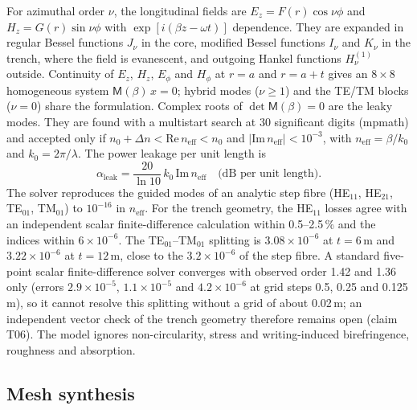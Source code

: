 \documentclass[11pt,a4paper]{article}
\newcommand{\um}{\,\textmu m\xspace}
\begin{document}
For azimuthal order $\nu$, the longitudinal fields are $E_z=F(r)\cos\nu\phi$ and $H_z=G(r)\sin\nu\phi$ with $\exp[i(\beta z-\omega t)]$ dependence. They are expanded in regular Bessel functions $J_\nu$ in the core, modified Bessel functions $I_\nu$ and $K_\nu$ in the trench, where the field is evanescent, and outgoing Hankel functions $H^{(1)}_\nu$ outside. Continuity of $E_z$, $H_z$, $E_\phi$ and $H_\phi$ at $r=a$ and $r=a+t$ gives an $8\times8$ homogeneous system $\mathsf{M}(\beta)\,x=0$; hybrid modes ($\nu\ge1$) and the TE/TM blocks ($\nu=0$) share the formulation. Complex roots of $\det\mathsf{M}(\beta)=0$ are the leaky modes. They are found with a multistart search at 30 significant digits (mpmath) and accepted only if $n_0+\Delta n<\mathrm{Re}\,n_\mathrm{eff}<n_0$ and $|\mathrm{Im}\,n_\mathrm{eff}|<10^{-3}$, with $n_\mathrm{eff}=\beta/k_0$ and $k_0=2\pi/\lambda$. The power leakage per unit length is
\begin{equation}
\alpha_\mathrm{leak}=\frac{20}{\ln 10}\,k_0\,\mathrm{Im}\,n_\mathrm{eff}\quad\text{(dB per unit length).}
\label{eq:leak}
\end{equation}
The solver reproduces the guided modes of an analytic step fibre (HE$_{11}$, HE$_{21}$, TE$_{01}$, TM$_{01}$) to $10^{-16}$ in $n_\mathrm{eff}$. For the trench geometry, the HE$_{11}$ losses agree with an independent scalar finite-difference calculation within 0.5--2.5\,\% and the indices within $6\times10^{-6}$. The TE$_{01}$--TM$_{01}$ splitting is $3.08\times10^{-6}$ at $t=6$\um and $3.22\times10^{-6}$ at $t=12$\um, close to the $3.2\times10^{-6}$ of the step fibre. A standard five-point scalar finite-difference solver converges with observed order 1.42 and 1.36 only (errors $2.9\times10^{-5}$, $1.1\times10^{-5}$ and $4.2\times10^{-6}$ at grid steps 0.5, 0.25 and 0.125\um), so it cannot resolve this splitting without a grid of about 0.02\um; an independent vector check of the trench geometry therefore remains open (claim T06). The model ignores non-circularity, stress and writing-induced birefringence, roughness and absorption.

\subsection{Mesh synthesis}
\label{sec:synthesis}
\end{document}
